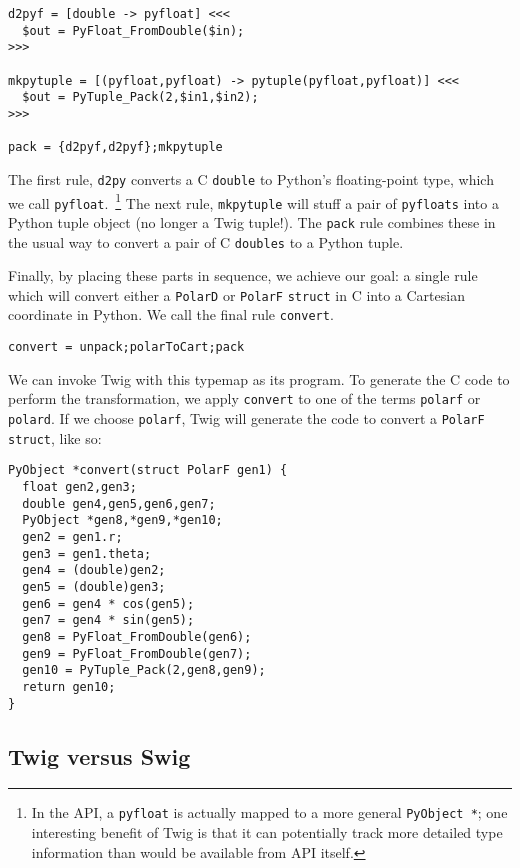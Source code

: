 \begin{verbatim}
d2pyf = [double -> pyfloat] <<<
  $out = PyFloat_FromDouble($in);
>>>

mkpytuple = [(pyfloat,pyfloat) -> pytuple(pyfloat,pyfloat)] <<<
  $out = PyTuple_Pack(2,$in1,$in2);
>>>

pack = {d2pyf,d2pyf};mkpytuple
\end{verbatim}

The first rule, \texttt{d2py} converts a C \texttt{double} to Python's floating-point type, which we call \texttt{pyfloat}.~\footnote{In the API, a \texttt{pyfloat} is actually mapped to a more general \texttt{PyObject *}; one interesting benefit of Twig is that it can potentially track more detailed type information than would be available from API itself.} The next rule, \texttt{mkpytuple} will stuff a pair of \texttt{pyfloats} into a Python tuple object (no longer a Twig tuple!). The \texttt{pack} rule combines these in the usual way to convert a pair of C \texttt{doubles} to a Python tuple.

Finally, by placing these parts in sequence, we achieve our goal: a single rule which will convert either a \texttt{PolarD} or \texttt{PolarF} \texttt{struct} in C into a Cartesian coordinate  in Python. We call the final rule \texttt{convert}.

\begin{verbatim}
convert = unpack;polarToCart;pack
\end{verbatim}

We can invoke Twig with this typemap as its program. To generate the C code to perform the transformation, we apply \texttt{convert} to one of the terms \texttt{polarf} or \texttt{polard}. If we choose \texttt{polarf}, Twig will generate the code to convert a \texttt{PolarF} \texttt{struct}, like so:

\begin{verbatim}
PyObject *convert(struct PolarF gen1) {
  float gen2,gen3;
  double gen4,gen5,gen6,gen7;
  PyObject *gen8,*gen9,*gen10;
  gen2 = gen1.r;
  gen3 = gen1.theta;
  gen4 = (double)gen2;
  gen5 = (double)gen3;
  gen6 = gen4 * cos(gen5);  
  gen7 = gen4 * sin(gen5);
  gen8 = PyFloat_FromDouble(gen6);
  gen9 = PyFloat_FromDouble(gen7);
  gen10 = PyTuple_Pack(2,gen8,gen9);
  return gen10;
}
\end{verbatim}

\subsection{Twig versus Swig}


